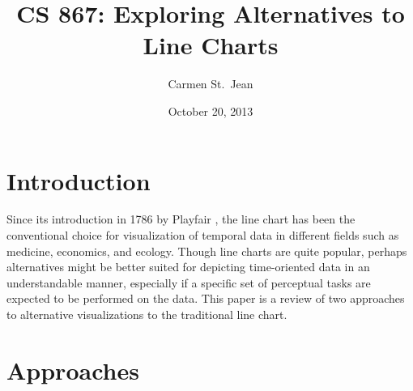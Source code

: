 \documentclass{article} %
\begin{document}
\title{CS 867: Exploring Alternatives to Line Charts}
\date{October 20, 2013}
\author{Carmen St.\ Jean}

\maketitle

\section{Introduction}

Since its introduction in 1786 by Playfair \cite{playfair1786}, the line chart has been the conventional choice for visualization of temporal data in different fields such as medicine, economics, and ecology.  Though line charts are quite popular, perhaps alternatives might be better suited for depicting time-oriented data in an understandable manner, especially if a specific set of perceptual tasks are expected to be performed on the data.  This paper is a review of two approaches to alternative visualizations to the traditional line chart.

\section{Approaches}
\end{document}
